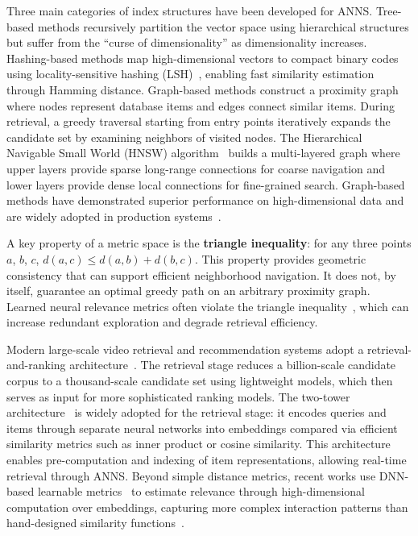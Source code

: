 Three main categories of index structures have been developed for ANNS. Tree-based methods recursively partition the vector space using hierarchical structures but suffer from the ``curse of dimensionality'' as dimensionality increases. Hashing-based methods map high-dimensional vectors to compact binary codes using locality-sensitive hashing (LSH)~\citep{indyk1998approximate}, enabling fast similarity estimation through Hamming distance. Graph-based methods construct a proximity graph where nodes represent database items and edges connect similar items. During retrieval, a greedy traversal starting from entry points iteratively expands the candidate set by examining neighbors of visited nodes. The Hierarchical Navigable Small World (HNSW) algorithm~\citep{malkov2018efficient} builds a multi-layered graph where upper layers provide sparse long-range connections for coarse navigation and lower layers provide dense local connections for fine-grained search. Graph-based methods have demonstrated superior performance on high-dimensional data and are widely adopted in production systems~\citep{wang2021comprehensive}.

A key property of a metric space is the \textbf{triangle inequality}: for any three points $a$, $b$, $c$, $d(a, c) \leq d(a, b) + d(b, c)$. This property provides geometric consistency that can support efficient neighborhood navigation. It does not, by itself, guarantee an optimal greedy path on an arbitrary proximity graph. Learned neural relevance metrics often violate the triangle inequality~\citep{chen2022approximate}, which can increase redundant exploration and degrade retrieval efficiency.

Modern large-scale video retrieval and recommendation systems adopt a retrieval-and-ranking architecture~\citep{cheng2016wide,covington2016deep}. The retrieval stage reduces a billion-scale candidate corpus to a thousand-scale candidate set using lightweight models, which then serves as input for more sophisticated ranking models. The two-tower architecture~\citep{yang2020mixed} is widely adopted for the retrieval stage: it encodes queries and items through separate neural networks into embeddings compared via efficient similarity metrics such as inner product or cosine similarity. This architecture enables pre-computation and indexing of item representations, allowing real-time retrieval through ANNS. Beyond simple distance metrics, recent works use DNN-based learnable metrics~\citep{dehghani2017neural,tay2018latent} to estimate relevance through high-dimensional computation over embeddings, capturing more complex interaction patterns than hand-designed similarity functions~\citep{tan2020fast,chen2022approximate}.

